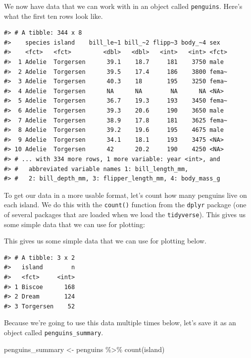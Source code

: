 \documentclass[
]{book}
\newenvironment{Shaded}{\begin{snugshade}}{\end{snugshade}}
\newcommand{\FunctionTok}[1]{\textcolor[rgb]{0.00,0.00,0.00}{#1}}
\newcommand{\NormalTok}[1]{#1}
\newcommand{\OtherTok}[1]{\textcolor[rgb]{0.56,0.35,0.01}{#1}}
\newcommand{\SpecialCharTok}[1]{\textcolor[rgb]{0.00,0.00,0.00}{#1}}
\begin{document}
We now have data that we can work with in an object called \texttt{penguins}. Here's what the first ten rows look like.

\begin{verbatim}
#> # A tibble: 344 x 8
#>    species island    bill_le~1 bill_~2 flipp~3 body_~4 sex  
#>    <fct>   <fct>         <dbl>   <dbl>   <int>   <int> <fct>
#>  1 Adelie  Torgersen      39.1    18.7     181    3750 male 
#>  2 Adelie  Torgersen      39.5    17.4     186    3800 fema~
#>  3 Adelie  Torgersen      40.3    18       195    3250 fema~
#>  4 Adelie  Torgersen      NA      NA        NA      NA <NA> 
#>  5 Adelie  Torgersen      36.7    19.3     193    3450 fema~
#>  6 Adelie  Torgersen      39.3    20.6     190    3650 male 
#>  7 Adelie  Torgersen      38.9    17.8     181    3625 fema~
#>  8 Adelie  Torgersen      39.2    19.6     195    4675 male 
#>  9 Adelie  Torgersen      34.1    18.1     193    3475 <NA> 
#> 10 Adelie  Torgersen      42      20.2     190    4250 <NA> 
#> # ... with 334 more rows, 1 more variable: year <int>, and
#> #   abbreviated variable names 1: bill_length_mm,
#> #   2: bill_depth_mm, 3: flipper_length_mm, 4: body_mass_g
\end{verbatim}

To get our data in a more usable format, let's count how many penguins live on each island. We do this with the \texttt{count()} function from the \texttt{dplyr} package (one of several packages that are loaded when we load the \texttt{tidyverse}). This gives us some simple data that we can use for plotting:

This gives us some simple data that we can use for plotting below.

\begin{verbatim}
#> # A tibble: 3 x 2
#>   island        n
#>   <fct>     <int>
#> 1 Biscoe      168
#> 2 Dream       124
#> 3 Torgersen    52
\end{verbatim}

Because we're going to use this data multiple times below, let's save it as an object called \texttt{penguins\_summary}.

\begin{Shaded}
\begin{Highlighting}[]
\NormalTok{penguins\_summary }\OtherTok{\textless{}{-}}\NormalTok{ penguins }\SpecialCharTok{\%\textgreater{}\%}
  \FunctionTok{count}\NormalTok{(island)}
\end{Highlighting}
\end{Shaded}
\end{document}
